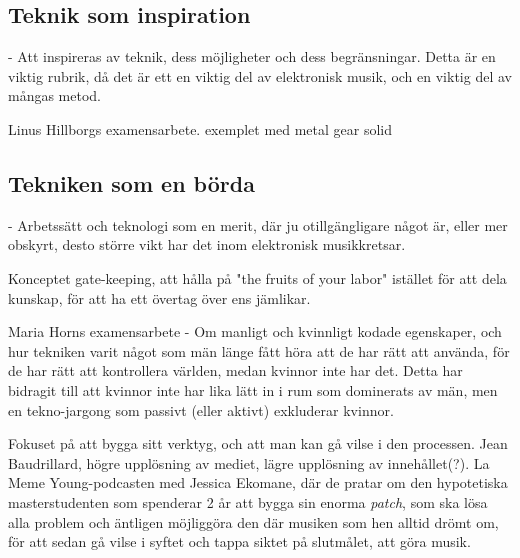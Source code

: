 \documentclass{article}
\begin{document}
\subsection{Teknik som inspiration}
- Att inspireras av teknik, dess möjligheter och dess begränsningar. Detta är en viktig rubrik, då det är ett
  en viktig del av elektronisk musik, och en viktig del av mångas metod. 

  Linus Hillborgs examensarbete. exemplet med metal gear solid

\subsection{Tekniken som en börda}
- Arbetssätt och teknologi som en merit, där ju otillgängligare något är, eller mer obskyrt, desto större vikt
  har det inom elektronisk musikkretsar. 

  Konceptet gate-keeping, att hålla på "the fruits of your labor" istället för att dela kunskap, för att ha
  ett övertag över ens jämlikar.

  Maria Horns examensarbete - Om manligt och kvinnligt kodade egenskaper, och hur tekniken varit något som män
  länge fått höra att de har rätt att använda, för de har rätt att kontrollera världen, medan kvinnor inte har
  det. Detta har bidragit till att kvinnor inte har lika lätt in i rum som dominerats av män, men en
  tekno-jargong som passivt (eller aktivt) exkluderar kvinnor. 

  Fokuset på att bygga sitt verktyg, och att man kan gå vilse i den processen. Jean Baudrillard, högre
  upplösning av mediet, lägre upplösning av innehållet(?). 
  La Meme Young-podcasten med Jessica Ekomane, där de pratar om den hypotetiska masterstudenten som spenderar
  2 år att bygga sin enorma \emph{patch}, som ska lösa alla problem och äntligen möjliggöra den där musiken
  som hen alltid drömt om, för att sedan gå vilse i syftet och tappa siktet på slutmålet, att göra musik. 


\end{document}
